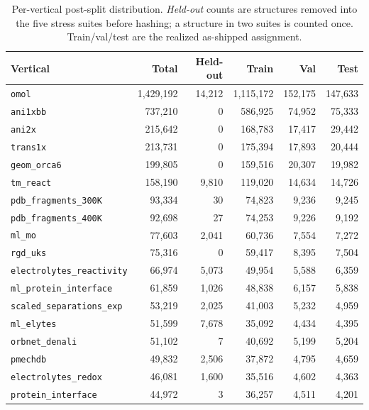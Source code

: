 \begin{table}[h]
\centering
\small
\caption{Per-vertical post-split distribution. \emph{Held-out} counts are
structures removed into the five stress suites before hashing; a structure in two
suites is counted once. Train/val/test are the realized as-shipped assignment.}
\label{tab:per_vertical_split}
\begin{tabular}{lrrrrr}
\toprule
Vertical & Total & Held-out & Train & Val & Test \\
\midrule
\texttt{omol} & 1{,}429{,}192 & 14{,}212 & 1{,}115{,}172 & 152{,}175 & 147{,}633 \\
\texttt{ani1xbb} & 737{,}210 & 0 & 586{,}925 & 74{,}952 & 75{,}333 \\
\texttt{ani2x} & 215{,}642 & 0 & 168{,}783 & 17{,}417 & 29{,}442 \\
\texttt{trans1x} & 213{,}731 & 0 & 175{,}394 & 17{,}893 & 20{,}444 \\
\texttt{geom\_orca6} & 199{,}805 & 0 & 159{,}516 & 20{,}307 & 19{,}982 \\
\texttt{tm\_react} & 158{,}190 & 9{,}810 & 119{,}020 & 14{,}634 & 14{,}726 \\
\texttt{pdb\_fragments\_300K} & 93{,}334 & 30 & 74{,}823 & 9{,}236 & 9{,}245 \\
\texttt{pdb\_fragments\_400K} & 92{,}698 & 27 & 74{,}253 & 9{,}226 & 9{,}192 \\
\texttt{ml\_mo} & 77{,}603 & 2{,}041 & 60{,}736 & 7{,}554 & 7{,}272 \\
\texttt{rgd\_uks} & 75{,}316 & 0 & 59{,}417 & 8{,}395 & 7{,}504 \\
\texttt{electrolytes\_reactivity} & 66{,}974 & 5{,}073 & 49{,}954 & 5{,}588 & 6{,}359 \\
\texttt{ml\_protein\_interface} & 61{,}859 & 1{,}026 & 48{,}838 & 6{,}157 & 5{,}838 \\
\texttt{scaled\_separations\_exp} & 53{,}219 & 2{,}025 & 41{,}003 & 5{,}232 & 4{,}959 \\
\texttt{ml\_elytes} & 51{,}599 & 7{,}678 & 35{,}092 & 4{,}434 & 4{,}395 \\
\texttt{orbnet\_denali} & 51{,}102 & 7 & 40{,}692 & 5{,}199 & 5{,}204 \\
\texttt{pmechdb} & 49{,}832 & 2{,}506 & 37{,}872 & 4{,}795 & 4{,}659 \\
\texttt{electrolytes\_redox} & 46{,}081 & 1{,}600 & 35{,}516 & 4{,}602 & 4{,}363 \\
\texttt{protein\_interface} & 44{,}972 & 3 & 36{,}257 & 4{,}511 & 4{,}201 \\

\end{tabular}
\end{table}
